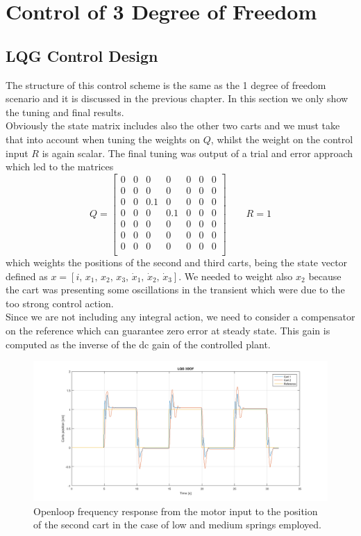 {\let\clearpage\relax \chapter{Control of 3 Degree of Freedom}}
\section{LQG Control Design}

The structure of this control scheme is the same as the 1 degree of freedom scenario and it is discussed in the previous chapter. In this section we only show the tuning and final results.\\

Obviously the state matrix includes also the other two carts and we must take that into account when tuning the weights on $Q$, whilst the weight on the control input $R$ is again scalar. The final tuning was output of a trial and error approach which led to the matrices
\begin{equation}
\renewcommand{\arraystretch}{1}
Q = 
\begin{bmatrix}
0 & 0 & 0 & 0 & 0 & 0 & 0\\
0 & 0 & 0 & 0 & 0 & 0 & 0\\
0 & 0 & 0.1 & 0 & 0 & 0 & 0\\
0 & 0 & 0 & 0.1 & 0 & 0 & 0\\
0 & 0 & 0 & 0 & 0 & 0 & 0\\
0 & 0 & 0 & 0 & 0 & 0 & 0\\
0 & 0 & 0 & 0 & 0 & 0 & 0\\
\end{bmatrix}
\qquad
R=1
\end{equation}
which weights the positions of the second and third carts, being the state vector defined as $x = \left[ i,\, x_1,\, x_2,\, x_3,\, \dot{x}_1,\, \dot{x}_2,\, \dot{x}_3 \right] $. We needed to weight also $x_2$ because the cart was presenting some oscillations in the transient which were due to the too strong control action.\\

Since we are not including any integral action, we need to consider a compensator on the reference which can guarantee zero error at steady state. This gain is computed as the inverse of the dc gain of the controlled plant.

\begin{figure}[h]
\centering
\includegraphics[width=0.5\linewidth]{img/lqg.png}
\caption{Openloop frequency response from the motor input to the position of the second cart in the case of low and medium springs employed.}
\label{fig:lqg3dof}
\end{figure}

